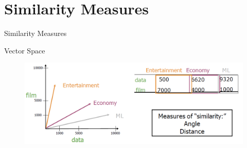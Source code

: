 \section{Similarity Measures}
\begin{frame}{}
    \LARGE Similarity Measures
\end{frame}

\begin{frame}{Vector Space}
    \begin{figure}
        \centering
        \includegraphics[width=\textwidth,height=0.8\textheight,keepaspectratio]{images/vector-space/vector-space.png}
    \end{figure}
\end{frame}

